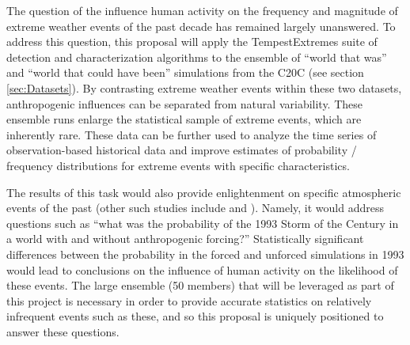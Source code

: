 \documentclass[11pt]{article}
\begin{document}
The question of the influence human activity on the frequency and magnitude of extreme weather events of the past decade has remained largely unanswered.  To address this question, this proposal will apply the TempestExtremes suite of detection and characterization algorithms to the ensemble of ``world that was'' and ``world that could have been'' simulations from the C20C (see section \ref{sec:Datasets}).  By contrasting extreme weather events within these two datasets, anthropogenic influences can be separated from natural variability. These ensemble runs enlarge the statistical sample of extreme events, which are inherently rare. These data can be further used to analyze the time series of observation-based historical data and improve estimates of probability / frequency distributions for extreme events with specific characteristics.



The results of this task would also provide enlightenment on specific atmospheric events of the past (other such studies include \cite{stott2004human} and \cite{pall2011anthropogenic}).  Namely, it would address questions such as ``what was the probability of the 1993 Storm of the Century in a world with and without anthropogenic forcing?''  Statistically significant differences between the probability in the forced and unforced simulations in 1993 would lead to conclusions on the influence of human activity on the likelihood of these events.  The large ensemble (50 members) that will be leveraged as part of this project is necessary in order to provide accurate statistics on relatively infrequent events such as these, and so this proposal is uniquely positioned to answer these questions.

\end{document}
